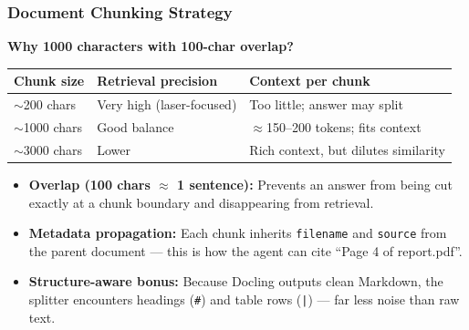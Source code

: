 \begin{frame}[fragile]\frametitle{Document Chunking Strategy}

\textbf{Why 1000 characters with 100-char overlap?}

\begin{center}
\small
\begin{tabular}{lll}
\hline
\textbf{Chunk size} & \textbf{Retrieval precision} & \textbf{Context per chunk} \\
\hline
$\sim$200 chars & Very high (laser-focused) & Too little; answer may split \\
$\sim$1000 chars & Good balance & $\approx$150--200 tokens; fits context \\
$\sim$3000 chars & Lower & Rich context, but dilutes similarity \\
\hline
\end{tabular}
\end{center}

\vspace{0.3em}
      \begin{itemize}
        \item \textbf{Overlap (100 chars $\approx$ 1 sentence):} Prevents an answer from being cut exactly at a chunk boundary and disappearing from retrieval.
        \item \textbf{Metadata propagation:} Each chunk inherits \texttt{filename} and \texttt{source} from the parent document --- this is how the agent can cite ``Page 4 of report.pdf''.
        \item \textbf{Structure-aware bonus:} Because Docling outputs clean Markdown, the splitter encounters headings (\texttt{\#}) and table rows (\texttt{|}) --- far less noise than raw text.
      \end{itemize}
\end{frame}

